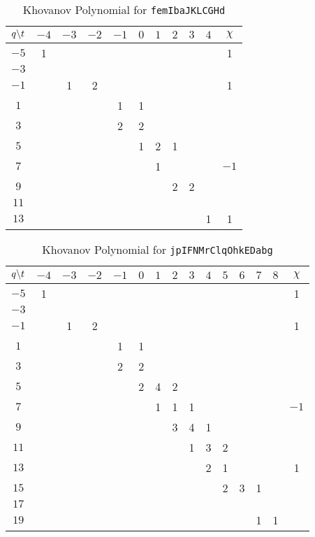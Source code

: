 \begin{table}
    \centering
    \begin{tabular}{| c | c | c | c | c | c | c | c | c | c | c |}
        \hline
        $q\symbol{92}t$&$-4$&$-3$&$-2$&$-1$&$0$&$1$&$2$&$3$&$4$&$\chi$\\
        \hline
        $-5$&1&&&&&&&&&1\\
        \hline
        $-3$&&&&&&&&&&\\
        \hline
        $-1$&&1&2&&&&&&&1\\
        \hline
        $1$&&&&1&1&&&&&\\
        \hline
        $3$&&&&2&2&&&&&\\
        \hline
        $5$&&&&&1&2&1&&&\\
        \hline
        $7$&&&&&&1&&&&$-1$\\
        \hline
        $9$&&&&&&&2&2&&\\
        \hline
        $11$&&&&&&&&&&\\
        \hline
        $13$&&&&&&&&&1&1\\
        \hline
    \end{tabular}
    \caption{Khovanov Polynomial for \texttt{femIbaJKLCGHd}}
    \label{table:femIbaJKLCGHd_kho}
\end{table}
\begin{table}
    \centering
    \begin{tabular}{| c | c | c | c | c | c | c | c | c | c | c | c | c | c | c |}
        \hline
        $q\symbol{92}t$&$-4$&$-3$&$-2$&$-1$&$0$&$1$&$2$&$3$&$4$&$5$&$6$&$7$&$8$&$\chi$\\
        \hline
        $-5$&1&&&&&&&&&&&&&1\\
        \hline
        $-3$&&&&&&&&&&&&&&\\
        \hline
        $-1$&&1&2&&&&&&&&&&&1\\
        \hline
        $1$&&&&1&1&&&&&&&&&\\
        \hline
        $3$&&&&2&2&&&&&&&&&\\
        \hline
        $5$&&&&&2&4&2&&&&&&&\\
        \hline
        $7$&&&&&&1&1&1&&&&&&$-1$\\
        \hline
        $9$&&&&&&&3&4&1&&&&&\\
        \hline
        $11$&&&&&&&&1&3&2&&&&\\
        \hline
        $13$&&&&&&&&&2&1&&&&1\\
        \hline
        $15$&&&&&&&&&&2&3&1&&\\
        \hline
        $17$&&&&&&&&&&&&&&\\
        \hline
        $19$&&&&&&&&&&&&1&1&\\
        \hline
    \end{tabular}
    \caption{Khovanov Polynomial for \texttt{jpIFNMrClqOhkEDabg}}
    \label{table:jpIFNMrClqOhkEDabg_kho}
\end{table}
